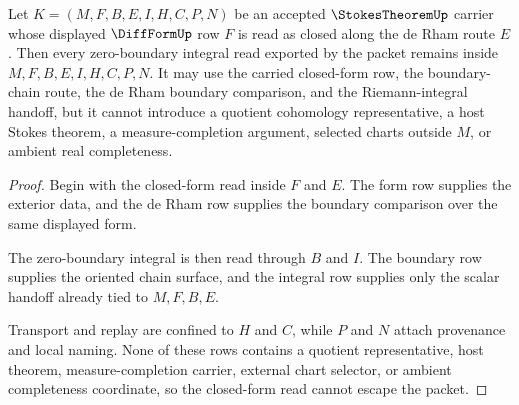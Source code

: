 \begin{theorem}\label{thm:stokes-theorem-closed-form-nonescape}
Let $K=(M,F,B,E,I,H,C,P,N)$ be an accepted $\StokesTheoremUp$ carrier whose displayed $\DiffFormUp$ row $F$ is read as closed along the de Rham route $E$. Then every zero-boundary integral read exported by the packet remains inside $M,F,B,E,I,H,C,P,N$. It may use the carried closed-form row, the boundary-chain route, the de Rham boundary comparison, and the Riemann-integral handoff, but it cannot introduce a quotient cohomology representative, a host Stokes theorem, a measure-completion argument, selected charts outside $M$, or ambient real completeness.
\end{theorem}
\begin{proof}
Begin with the closed-form read inside $F$ and $E$. The form row supplies the exterior data, and the de Rham row supplies the boundary comparison over the same displayed form.

The zero-boundary integral is then read through $B$ and $I$. The boundary row supplies the oriented chain surface, and the integral row supplies only the scalar handoff already tied to $M,F,B,E$.

Transport and replay are confined to $H$ and $C$, while $P$ and $N$ attach provenance and local naming. None of these rows contains a quotient representative, host theorem, measure-completion carrier, external chart selector, or ambient completeness coordinate, so the closed-form read cannot escape the packet.
\end{proof}


\begin{closurestatus}{\StokesTheoremUp}
  \theoryclosure{\seedClosure}
  \formalstatus{\unformalizedV}
\end{closurestatus}
